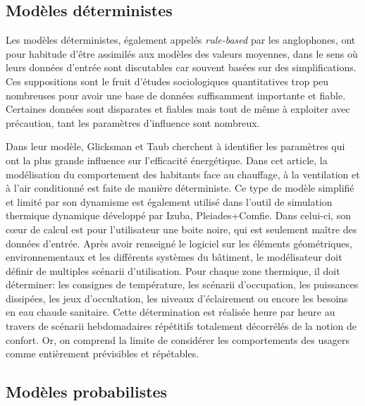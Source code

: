 \subsection{Modèles déterministes}

Les modèles déterministes, également appelés \textit{rule-based} par les anglophones, ont pour habitude d'être assimilés aux modèles des valeurs moyennes, dans le sens où leurs données d'entrée sont discutables car souvent basées sur des simplifications. Ces suppositions sont le fruit d'études sociologiques quantitatives trop peu nombreuses pour avoir une base de données suffisamment importante et fiable. Certaines données sont disparates et fiables mais tout de même à exploiter avec précaution, tant les paramètres d'influence sont nombreux.

Dans leur modèle, Glicksman et Taub \cite{Glicksman-97} cherchent à identifier les paramètres qui ont la plus grande influence sur l'efficacité énergétique. Dans cet article, la modélisation du comportement des habitants face au chauffage, à la ventilation et à l'air conditionné est faite de manière déterministe. Ce type de modèle simplifié et limité par son dynamisme est également utilisé dans l'outil de simulation thermique dynamique développé par Izuba, Pleiades+Comfie. Dans celui-ci, son cœur de calcul est pour l'utilisateur une boite noire, qui est seulement maître des données d'entrée. Après avoir renseigné le logiciel sur les éléments géométriques, environnementaux et les différents systèmes du bâtiment, le modélisateur doit définir de multiples scénarii d'utilisation. Pour chaque zone thermique, il doit déterminer: les consignes de température, les scénarii d'occupation, les puissances dissipées, les jeux d'occultation, les niveaux d'éclairement ou encore les besoins en eau chaude sanitaire. Cette détermination est réalisée heure par heure au travers de scénarii hebdomadaires répétitifs totalement décorrélés de la notion de confort. Or, on comprend la limite de considérer les comportements des usagers comme entièrement prévisibles et répétables.

\subsection{Modèles probabilistes}

